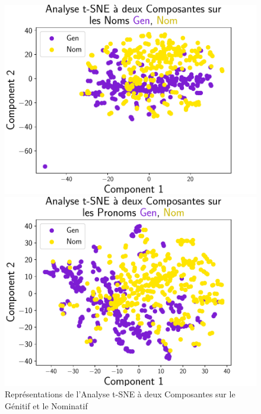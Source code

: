 \documentclass{cours}
\begin{document}
\begin{figure}[H]
        \begin{minipage}{.5\textwidth}
            \begin{center}
                \includegraphics[width=\linewidth]{Figures/Visualisations/tsne_Gen_Nom_Nouns.pdf}
            \end{center}
        \end{minipage}
        \begin{minipage}{.5\textwidth}
            \begin{center}
                \includegraphics[width=\linewidth]{Figures/Visualisations/tsne_Gen_Nom_Pronouns.pdf}
            \end{center}
        \end{minipage}
        \caption{Représentations de l'Analyse t-SNE à deux Composantes sur le Génitif et le Nominatif}
    \end{figure}
\end{document}
